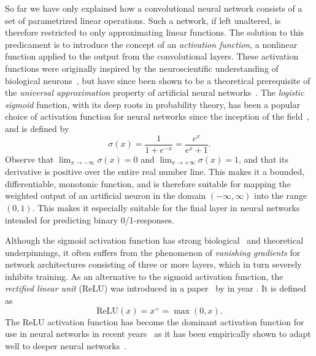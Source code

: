 So far we have only explained how a convolutional neural network consists of a set of parametrized linear operations.
Such a network, if left unaltered, is therefore restricted to only approximating linear functions.
The solution to this predicament is to introduce the concept of an \textit{activation function}, a nonlinear function applied to the output from the convolutional layers.
These activation functions were originally inspired by the neuroscientific understanding of biological neurons~\cite[p.~165]{goodfellow}, but have since been shown to be a theoretical prerequisite of the \textit{universal approximation} property of artificial neural networks~\cite{uat-sigmoid,uat-nonpolynomial}.
The \textit{logistic sigmoid} function, with its deep roots in probability theory, has been a popular choice of activation function for neural networks since the inception of the field~\cite{rosenblatt-perceptron-1958}, and is defined by
%
\begin{equation*}
  \sigma(x) = \frac{1}{1 + e^{-x}} = \frac{e^x}{e^x + 1}.
  \tag{Sigmoid activation function}
\end{equation*}
%
Observe that $\lim_{x \to -\infty} \sigma(x) = 0$ and $\lim_{x \to +\infty} \sigma(x) = 1$, and that its derivative is positive over the entire real number line. This makes it a bounded, differentiable, monotonic function, and is therefore suitable for mapping the weighted output of an artificial neuron in the domain $(-\infty, \infty)$ into the range $(0, 1)$.
This makes it especially suitable for the final layer in neural networks intended for predicting binary 0/1-responses.

Although the sigmoid activation function has strong biological~\cite{rosenblatt-perceptron-1958} and theoretical~\cite{uat-sigmoid} underpinnings, it often suffers from the phenomenon of \textit{vanishing gradients} for network architectures consisting of three or more layers, which in turn severely inhibits training.
As an alternative to the sigmoid activation function, the \textit{rectified linear unit} (ReLU) was introduced in a paper~\cite{relu-original-paper} by \citeauthor{relu-original-paper} in year \citeyear{relu-original-paper}.
It is defined as
%
\begin{equation*}
  \mathrm{ReLU}(x) = x^+ = \max(0, x).
  \tag{ReLU activation function}
\end{equation*}
%
The ReLU activation function has become the dominant activation function for use in neural networks in recent years~\cite[p.~438]{relu-popularity} as it has been empirically shown to adapt well to deeper neural networks~\cite{relu-better-than-sigmoid}.
\raggedbottom
